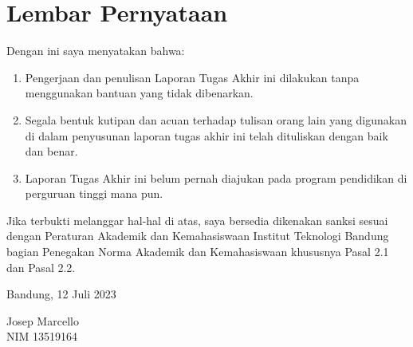 \chapter*{Lembar Pernyataan}

Dengan ini saya menyatakan bahwa:

\begin{enumerate}

	\item Pengerjaan dan penulisan Laporan Tugas Akhir ini dilakukan tanpa
	      menggunakan bantuan yang tidak dibenarkan.
	\item Segala bentuk kutipan dan acuan terhadap tulisan orang lain yang
	      digunakan di dalam penyusunan laporan tugas akhir ini telah dituliskan
	      dengan baik dan benar.
	\item Laporan Tugas Akhir ini belum pernah diajukan pada program pendidikan
	      di perguruan tinggi mana pun.

\end{enumerate}

Jika terbukti melanggar hal-hal di atas, saya bersedia dikenakan sanksi sesuai
dengan Peraturan Akademik dan Kemahasiswaan Institut Teknologi Bandung bagian
Penegakan Norma Akademik dan Kemahasiswaan khususnya Pasal 2.1 dan Pasal 2.2.

\vspace{10mm}

Bandung, 12 Juli 2023

\vspace{30mm}

Josep Marcello \\
NIM 13519164
